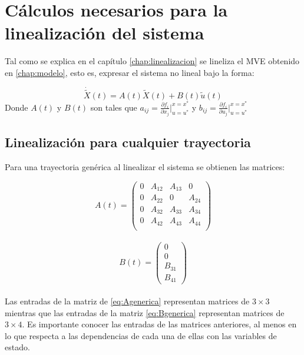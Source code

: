 %


\chapter{C\'alculos necesarios para la linealizaci\'on del sistema}
\label{chap:anexo_linealizacion}

Tal como se explica en el cap\'itulo \ref{chap:linealizacion} se lineliza el MVE obtenido en \ref{chap:modelo}, esto es, expresar el sistema no lineal bajo la forma:

\begin{equation}
\dot{\tilde{X}}(t)=A(t)\tilde{X}(t)+B(t)\tilde{u}(t)
\end{equation}
Donde $A(t)$ y $B(t)$ son tales que $a_{ij}= \frac{\partial f_i}{\partial x_j}\vert_{u=u^*}^{x=x^*}$ y  $b_{ij}= \frac{\partial f_i}{\partial u_j}\vert_{u=u^*}^{x=x^*}$

\section{Linealizaci\'on para cualquier trayectoria}

Para una trayectoria gen\'erica al linealizar el sistema se obtienen las matrices:

\begin{equation}
\label{eq:Agenerica}
A(t)=\left(\begin{array}{cccc}
0 & A_{12} & A_{13} & 0 \\
0 & A_{22} & 0      & A_{24}\\
0 & A_{32} & A_{33} & A_{34}\\
0 & A_{42}     & A_{43}      & A_{44} \\    
\end{array}\right)
\end{equation}\\


\begin{equation}
\label{eq:Bgenerica}
B(t)=\left(\begin{array}{c}
0\\
0\\
B_{31}\\
B_{41} 
\end{array}\right)
\end{equation}\\
Las entradas de la matriz de \ref{eq:Agenerica} representan matrices de $3\times3$ mientras que las entradas de la matriz \ref{eq:Bgenerica} representan matrices de $3\times4$. Es importante conocer las entradas de las matrices anteriores, al menos en lo que respecta a las dependencias de cada una de ellas con las variables de estado. 

